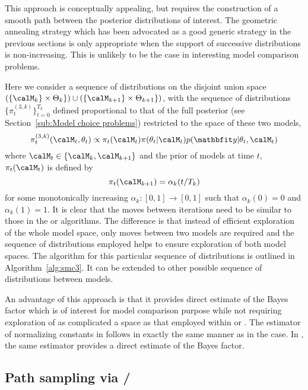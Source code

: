 This approach is conceptually appealing, but requires the construction of a smooth path between the posterior distributions of interest. The geometric annealing strategy which has been advocated as a good generic strategy in the previous sections is only appropriate when the support of successive distributions is non-increasing. This is unlikely to be the case in interesting model comparison problems.

Here we consider a sequence of distributions on the disjoint union space $(\{\calM_k\}\times\Theta_k\})\cup(\{\calM_{k+1}\}\times\Theta_{k+1}\})$, with the sequence of distributions $\{\pi_t^{(3,k)}\}_{t=0}^{T_k}$ defined proportional to that of the full posterior (see Section~\ref{sub:Model choice problems}) restricted to the space of these two models,
\begin{equation}
  \pi_t^{(3,k)}(\calM_t,\theta_t) \propto
  \pi_t(\calM_t) \pi(\theta_t|\calM_t) p(\data|\theta_t,\calM_t)
\end{equation}
where $\calM_t\in\{\calM_k,\calM_{k+1}\}$ and the prior of models at time $t$, $\pi_t(\calM_t)$ is defined by
\begin{equation}
  \pi_t(\calM_{k+1}) = \alpha_k(t/T_k)
  \label{eq:smc3_prior}
\end{equation}
for some monotonically increasing $\alpha_k:[0,1]\to[0,1]$ such that $\alpha_k(0) = 0$ and $\alpha_k(1) = 1$. It is clear that the \mcmc moves between iterations need to be similar to those in the \rjmcmc or \smc[1] algorithms. The difference is that instead of efficient exploration of the whole model space, only moves between two models are required and the sequence of distributions employed helps to ensure exploration of both model spaces. The algorithm for this particular sequence of distributions is outlined in Algorithm~\ref{alg:smc3}. It can be extended to other possible sequence of distributions between models.



An advantage of this approach is that it provides direct estimate of the Bayes factor which is of interest for model comparison purpose while not requiring exploration of as complicated a space as that employed within \rjmcmc or \smc[1]. The estimator of normalizing constants in \smc[3] follows in exactly the same manner as in the \smc[2] case. In \smc[3], the same estimator provides a direct estimate of the Bayes factor.

\subsection{Path sampling via \smc[2]/\smc[3]}
\label{sub:Path Sampling via smc2/smc3}

